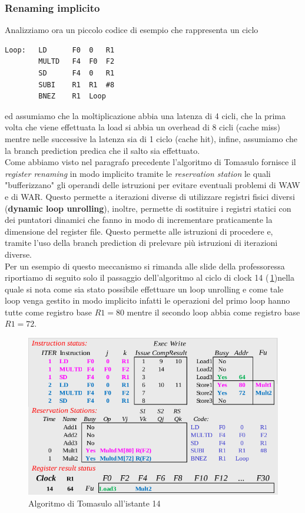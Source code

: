 \subsubsection{Renaming implicito}
Analizziamo ora un piccolo codice di esempio che rappresenta un ciclo
\begin{verbatim}
Loop:  	LD		F0	0	R1
		MULTD	F4	F0	F2
		SD		F4	0	R1
		SUBI	R1	R1	#8
		BNEZ	R1	Loop
\end{verbatim}
ed assumiamo che la moltiplicazione abbia una latenza di 4 cicli, che la prima volta che viene effettuata la load si abbia un overhead di 8 cicli (cache miss) mentre nelle successive la latenza sia di 1 ciclo (cache hit), infine, assumiamo che la branch prediction predica che il salto sia effettuato.\\
Come abbiamo visto nel paragrafo precedente l'algoritmo di Tomasulo fornisce il \emph{register renaming} in modo implicito tramite le \emph{reservation station} le quali "bufferizzano" gli operandi delle istruzioni per evitare eventuali problemi di WAW e di WAR. Questo permette a iterazioni diverse di utilizzare registri fisici diversi (\textbf{dynamic loop unrolling}), inoltre, permette di sostituire i registri statici con dei puntatori dinamici che fanno in modo di incrementare praticamente la dimensione del register file. Questo permette alle istruzioni di procedere e, tramite l'uso della branch prediction di prelevare più istruzioni di iterazioni diverse.\\
Per un esempio di questo meccanismo si rimanda alle slide della professoressa riportiamo di seguito solo il passaggio dell'algoritmo al ciclo di clock 14 (\figurename\,\ref{fig:ciclo14})nella quale si nota come sia stato possibile effettuare un loop unrolling e come tale loop venga gestito in modo implicito infatti le operazioni del primo loop hanno tutte come registro base $R1 = 80$ mentre il secondo loop abbia come registro base $R1 = 72$.\\
\begin{figure}
\centering
\includegraphics[scale=0.5]{img/ciclo14.png}
\caption{Algoritmo di Tomasulo all'istante 14}\label{fig:ciclo14}
\end{figure}
